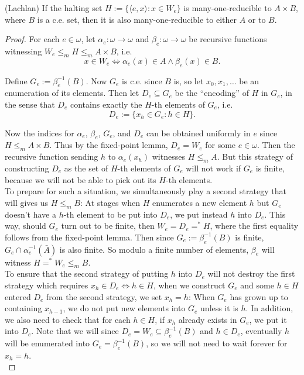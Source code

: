 \begin{theorem}
  (Lachlan) If the halting set $H:=\{\langle e,x\rangle: x\in W_e\}$ is
  many-one-reducible to $A\times B$, where $B$ is a c.e. set, then it is
  also many-one-reducible to either $A$ or to $B$.
\end{theorem}
\begin{proof}
  For each $e\in\omega$, let $\alpha_e:\omega \rightarrow\omega$ and
  $\beta_e:\omega \rightarrow\omega$ be recursive functions witnessing
  $W_e\leq_m H\leq_m A\times B$, i.e.
  \[x\in W_e \Leftrightarrow \alpha_e(x)\in A \wedge \beta_e(x)\in B.\]

  Define $G_e:=\beta_e^{-1}(B)$. Now $G_e$ is c.e. since $B$ is, so let
  $x_0,x_1,\ldots$ be an enumeration of its elements. Then let
  $D_e\subseteq G_e$ be the ``encoding'' of $H$ in $G_e$, in the sense that
  $D_e$ contains exactly the $H$-th elements of $G_e$, i.e.
  \[D_e :=\{x_h\in G_e: h\in H\}.\]

  Now the indices for $\alpha_e$, $\beta_e$, $G_e$, and $D_e$ can be
  obtained uniformly in $e$ since $H\leq_m A\times B$. Thus by the
  fixed-point lemma, $D_e=W_e$ for some $e\in\omega$. Then the recursive
  function sending $h$ to $\alpha_e(x_h)$ witnesses $H\leq_m A$. But this
  strategy of constructing $D_e$ as the set of $H$-th elements of $G_e$
  will not work if $G_e$ is finite, because we will not be able to pick out
  its $H$-th elements.\\

  To prepare for such a situation, we simultaneously play a second strategy
  that will gives us $H\leq_m B$: At stages when $H$ enumerates a new
  element $h$ but $G_e$ doesn't have a $h$-th element to be put into
  $D_e$, we put instead $h$ into $D_e$. This way, should $G_e$ turn out to
  be finite, then $W_e=D_e=^*H$, where the first equality follows from the
  fixed-point lemma. Then since $G_e:=\beta_e^{-1}(B)$ is finite,
  $G_e\cap \alpha_e^{-1}(\bar{A})$ is also finite. So modulo a finite
  number of elements, $\beta_e$ will witness $H=^*W_e\leq_m B$.\\

  To ensure that the second strategy of putting $h$ into $D_e$ will not
  destroy the first strategy which requires $x_h\in D_e \Leftrightarrow
  h\in H$, when we construct $G_e$ and some $h\in H$ entered $D_e$ from
  the second strategy, we set $x_h=h$: When $G_e$ has grown up to
  containing $x_{h-1}$, we do not put new elements into $G_e$ unless it is
  $h$. In addition, we also need to check that for each $h\in H$, if $x_h$
  already exists in $G_e$, we put it into $D_e$. Note that we will since
  $D_e=W_e\subseteq\beta_e^{-1}(B)$ and $h\in D_e$, eventually $h$ will be
  enumerated into $G_e=\beta_e^{-1}(B)$, so we will not need to wait
  forever for $x_h=h$. \\


\end{proof}
